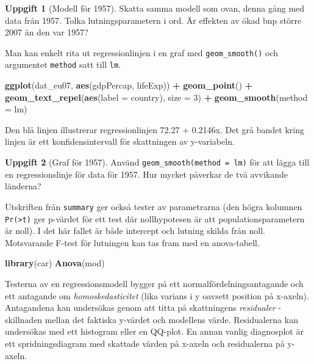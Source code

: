 \documentclass[
]{book}
\newenvironment{Shaded}{\begin{snugshade}}{\end{snugshade}}
\newcommand{\AttributeTok}[1]{\textcolor[rgb]{0.13,0.29,0.53}{#1}}
\newcommand{\DecValTok}[1]{\textcolor[rgb]{0.00,0.00,0.81}{#1}}
\newcommand{\FunctionTok}[1]{\textcolor[rgb]{0.13,0.29,0.53}{\textbf{#1}}}
\newcommand{\NormalTok}[1]{#1}
\newcommand{\SpecialCharTok}[1]{\textcolor[rgb]{0.81,0.36,0.00}{\textbf{#1}}}
\theoremstyle{definition}
\theoremstyle{definition}
\theoremstyle{definition}
\newtheorem{exercise}{Uppgift}[chapter]
\theoremstyle{definition}
\theoremstyle{remark}
\begin{document}
\begin{exercise}[Modell för 1957]
Skatta samma modell som ovan, denna gång med data från 1957. Tolka lutningsparametern i ord. Är effekten av ökad bnp större 2007 än den var 1957?
\end{exercise}

Man kan enkelt rita ut regressionlinjen i en graf med \texttt{geom\_smooth()} och argumentet \texttt{method} satt till \texttt{lm}.

\begin{Shaded}
\begin{Highlighting}[]
\FunctionTok{ggplot}\NormalTok{(dat\_eu07, }\FunctionTok{aes}\NormalTok{(gdpPercap, lifeExp)) }\SpecialCharTok{+}
  \FunctionTok{geom\_point}\NormalTok{() }\SpecialCharTok{+}
  \FunctionTok{geom\_text\_repel}\NormalTok{(}\FunctionTok{aes}\NormalTok{(}\AttributeTok{label =}\NormalTok{ country), }\AttributeTok{size =} \DecValTok{3}\NormalTok{) }\SpecialCharTok{+}
  \FunctionTok{geom\_smooth}\NormalTok{(}\AttributeTok{method =}\NormalTok{ lm)}
\end{Highlighting}
\end{Shaded}

Den blå linjen illustrerar regressionlinjen 72.27 + 0.2146x. Det grå bandet kring linjen är ett konfidensintervall för skattningen av y-variabeln.

\begin{exercise}[Graf för 1957]
Använd \texttt{geom\_smooth(method\ =\ lm)} för att lägga till en regressionslinje för data för 1957. Hur mycket påverkar de två avvikande länderna?
\end{exercise}

Utskriften från \texttt{summary} ger också tester av parametrarna (den högra kolumnen \texttt{Pr(\textgreater{}\textbar{}t\textbar{})} ger p-värdet för ett test där nollhypotesen är att populationsparametern är noll). I det här fallet är både intercept och lutning skilda från noll. Motsvarande F-test för lutningen kan tas fram med en anova-tabell.

\begin{Shaded}
\begin{Highlighting}[]
\FunctionTok{library}\NormalTok{(car)}
\FunctionTok{Anova}\NormalTok{(mod)}
\end{Highlighting}
\end{Shaded}

Testerna av en regressionsmodell bygger på ett normalfördelningsantagande och ett antagande om \emph{homoskedasticitet} (lika varians i y oavsett position på x-axeln). Antagandena kan undersökas genom att titta på skattningens \emph{residualer} - skillnaden mellan det faktiska y-värdet och modellens värde. Residualerna kan undersökas med ett histogram eller en QQ-plot. En annan vanlig diagnosplot är ett spridningsdiagram med skattade värden på x-axeln och residualerna på y-axeln.
\end{document}
